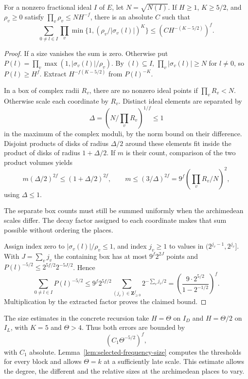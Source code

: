 \begin{lemma}\label{lem:lattice-frequency}
For a nonzero fractional ideal \(I\) of \(E\), let \(N=\sqrt{N(I)}\).
If \(H\ge1\), \(K\ge5/2\), and \(\rho_v\ge0\) satisfy
\(\prod_v\rho_v\le NH^{-f}\), there is an absolute \(C\) such that
\[
 \sum_{0\ne l\in I}\prod_v
  \min\{1,(\rho_v/|\sigma_v(l)|)^K\}
  \le (C H^{-(K-5/2)})^f .
\]
\end{lemma}

\begin{proof}
If a size vanishes the sum is zero. Otherwise put
\(P(l)=\prod_v\max(1,|\sigma_v(l)|/\rho_v)\).
By \((l)\subseteq I\), \(\prod_v|\sigma_v(l)|\ge N\) for
\(l\ne0\), so \(P(l)\ge H^f\). Extract
\(H^{-f(K-5/2)}\) from \(P(l)^{-K}\).

In a box of complex radii \(R_v\), there are no nonzero ideal
points if \(\prod_v R_v<N\). Otherwise scale each coordinate by
\(R_v\). Distinct ideal elements are separated by
\[
 \Delta=(N/\prod_v R_v)^{1/f}\le1
\]
in the maximum of the
complex moduli, by the norm bound on their difference. Disjoint
products of disks of radius \(\Delta/2\) around these elements fit
inside the product of disks of radius \(1+\Delta/2\). If \(m\) is their count, comparison of the two product volumes yields
\[
 m(\Delta/2)^{2f}\le(1+\Delta/2)^{2f},\qquad
 m\le(3/\Delta)^{2f}=9^f\left(\prod_v R_v/N\right)^2 ,
\]
using \(\Delta\le1\).


The separate box counts must still be summed uniformly when the archimedean scales differ. The decay factor assigned to each coordinate makes that sum possible without ordering the places.

Assign index zero to \(|\sigma_v(l)|/\rho_v\le1\), and index
\(j_v\ge1\) to values in \((2^{j_v-1},2^{j_v}]\). With
\(J=\sum_v j_v\) the containing box has at most \(9^f2^{2J}\)
points and \(P(l)^{-5/2}\le2^{5f/2}2^{-5J/2}\). Hence
\[
 \sum_{0\ne l\in I}P(l)^{-5/2}
 \le 9^f 2^{5f/2}\sum_{(j_v)\in\mathbf Z_{\ge0}^f}2^{-\sum_v j_v/2}
 =\left(\frac{9\cdot2^{5/2}}{1-2^{-1/2}}\right)^f .
\]
Multiplication by the extracted factor proves the claimed bound.
\end{proof}

The size estimates in the concrete recursion take \(H=\Theta\)
on \(I_D\) and \(H=\Theta/2\) on \(I_L\), with \(K=5\) and
\(\Theta>4\). Thus both errors are bounded by
\[
 (C_1\Theta^{-5/2})^f,
\]
with \(C_1\) absolute. Lemma~\ref{lem:selected-frequency-size} computes the thresholds for every block and allows \(\Theta=k\) at a sufficiently late scale. This estimate
allows the degree, the different and the relative sizes at the
archimedean places to vary.

